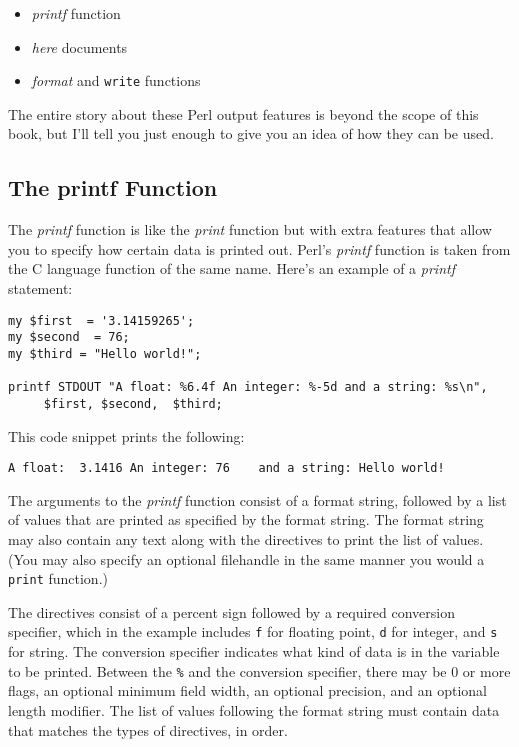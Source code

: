 \begin{itemize}
  \item \textit{printf} function
  \item \textit{here} documents
  \item \textit{format} and \verb|write| functions
\end{itemize}

The entire story about these Perl output features is beyond the scope of this book, but I'll tell you just enough to give you an idea of how they can be used.  

\subsection{The printf Function}
The \textit{printf} function is like the \textit{print} function but with extra features that allow you to specify how certain data is printed out. Perl's \textit{printf} function is taken from the C language function of the same name. Here's an example of a \textit{printf} statement: 

\begin{lstlisting}
my $first  = '3.14159265';
my $second  = 76;
my $third = "Hello world!";

printf STDOUT "A float: %6.4f An integer: %-5d and a string: %s\n", 
     $first, $second,  $third;
\end{lstlisting}

This code snippet prints the following:

\begin{lstlisting}
A float:  3.1416 An integer: 76    and a string: Hello world!
\end{lstlisting}

The arguments to the \textit{printf} function consist of a format string, followed by a list of values that are printed as specified by the format string. The format string may also contain any text along with the directives to print the list of values. (You may also specify an optional filehandle in the same manner you would a \verb|print| function.)

The directives consist of a percent sign followed by a required conversion specifier, which in the example includes \verb|f| for floating point, \verb|d| for integer, and \verb|s| for string. The conversion specifier indicates what kind of data is in the variable to be printed. Between the \verb|%| and the conversion specifier, there may be 0 or more flags, an optional minimum field width, an optional precision, and an optional length modifier. The list of values following the format string must contain data that matches the types of directives, in order.

